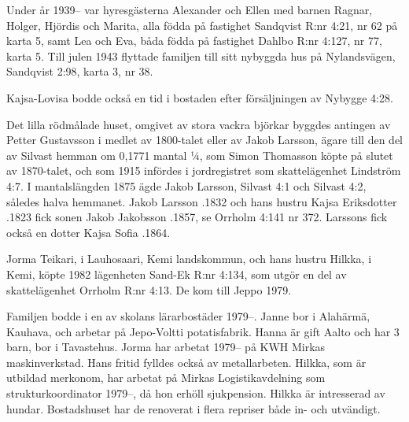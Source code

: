 Under år 1939-- var hyresgästerna Alexander och Ellen  med barnen Ragnar, Holger, Hjördis och Marita, alla födda på fastighet Sandqvist R:nr 4:21, nr 62 på karta 5, samt Lea och Eva, båda födda på fastighet Dahlbo R:nr 4:127, nr 77, karta 5.	Till julen 1943 flyttade familjen till sitt nybyggda hus på Nylandsvägen, Sandqvist 2:98, karta 3, nr 38.

Kajsa-Lovisa  bodde också en tid i bostaden efter försäljningen av Nybygge 4:28.

Det lilla rödmålade huset, omgivet av stora vackra björkar byggdes antingen av Petter Gustavsson i medlet av 1800-talet eller av Jakob Larsson, ägare till den del av Silvast hemman om 0,1771 mantal ¼, som Simon Thomasson köpte på slutet av 1870-talet, och som 1915 infördes i jordregistret som skattelägenhet Lindström 4:7. I mantalslängden 1875 ägde Jakob Larsson, Silvast 4:1 och Silvast 4:2, således halva hemmanet.	Jakob Larsson .1832 och hans hustru Kajsa Eriksdotter .1823 fick sonen Jakob Jakobsson .1857, se Orrholm 	4:141 nr 372. Larssons fick också en dotter Kajsa Sofia .1864.






Jorma Teikari,  i Lauhosaari, Kemi landskommun, och hans 	hustru Hilkka,  i Kemi, köpte 1982 lägenheten Sand-Ek R:nr 4:134, som utgör en del av skattelägenhet Orrholm R:nr 4:13. De kom till Jeppo 1979.
\begin{jhchildren}
  \item {}
  \item {}
\end{jhchildren}
Familjen bodde i en av skolans lärarbostäder 1979--.	Janne bor i Alahärmä, Kauhava, och arbetar på Jepo-Voltti potatisfabrik. Hanna är gift Aalto och har 3 barn, bor i Tavastehus. Jorma har arbetat 1979-- på KWH Mirkas maskinverkstad.	Hans fritid fylldes också av metallarbeten. Hilkka, som är utbildad merkonom, har arbetat på Mirkas Logistikavdelning som strukturkoordinator	1979--, då hon erhöll sjukpension. Hilkka är intresserad av hundar. Bostadshuset har de renoverat i flera repriser både in- och utvändigt.


